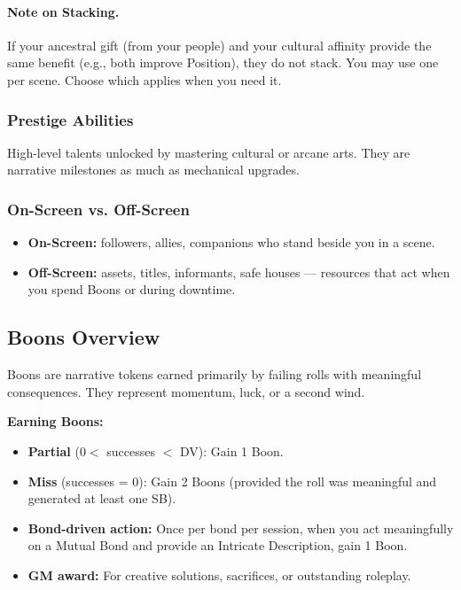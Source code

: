 \paragraph{Note on Stacking.}
If your ancestral gift (from your people) and your cultural affinity provide 
the same benefit (e.g., both improve Position), they do not stack. You may 
use one per scene. Choose which applies when you need it.

\subsubsection{Prestige Abilities}
High-level talents unlocked by mastering cultural or arcane arts. They are narrative milestones as much as mechanical upgrades.

\subsubsection{On-Screen vs. Off-Screen}
\begin{itemize}
  \item \textbf{On-Screen:} followers, allies, companions who stand beside you in a scene.
  \item \textbf{Off-Screen:} assets, titles, informants, safe houses --- resources that act when you spend Boons or during downtime.
\end{itemize}

\subsection{Boons Overview}

Boons are narrative tokens earned primarily by failing rolls with meaningful consequences. They represent momentum, luck, or a second wind.

\textbf{Earning Boons:}
\begin{itemize}
  \item \textbf{Partial} ($0 <$ successes $<$ DV): Gain 1 Boon.
  \item \textbf{Miss} (successes = 0): Gain 2 Boons (provided the roll was meaningful and generated at least one SB).
  \item \textbf{Bond-driven action:} Once per bond per session, when you act meaningfully on a Mutual Bond and provide an Intricate Description, gain 1 Boon.
  \item \textbf{GM award:} For creative solutions, sacrifices, or outstanding roleplay.
\end{itemize}

